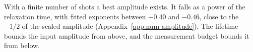 With a finite number of shots a best amplitude exists. It falls as a power of the relaxation time, with fitted
exponents between $-0.40$ and $-0.46$, close to the $-1/2$ of the scaled amplitude
(Appendix~\ref{app:num-amplitude}). The lifetime bounds the input amplitude from above, and the measurement budget
bounds it from below.
